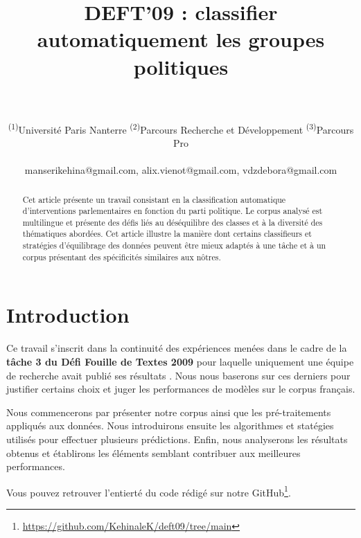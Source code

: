 \documentclass[11pt]{article}
\title{DEFT'09 : classifier automatiquement les groupes politiques}
\author{
  \text{MANSERI Kéhina\textsuperscript{(1)(2)}}
  \text{SIRVEN-VIENOT Alix\textsuperscript{(1)(2)}}
  \text{VAN-DEN-ZANDE Débora\textsuperscript{(1)(3)}}
\\
\\
  \textsuperscript{(1)}Université Paris Nanterre
  \textsuperscript{(2)}Parcours Recherche et Développement
  \textsuperscript{(3)}Parcours Pro
\\
\\
    \small {
    manserikehina@gmail.com, alix.vienot@gmail.com, vdzdebora@gmail.com
    }
\\
}
\begin{document}
\maketitle

\begin{abstract}

Cet article présente un travail consistant en la classification automatique d'interventions parlementaires en fonction du parti politique. Le corpus analysé est multilingue et présente des défis liés au déséquilibre des classes et à la diversité des thématiques abordées. Cet article illustre la manière dont certains classifieurs et stratégies d'équilibrage des données peuvent être mieux adaptés à une tâche et à un corpus présentant des spécificités similaires aux nôtres.


\end{abstract}

\section{Introduction}

Ce travail s'inscrit dans la continuité des expériences menées dans le cadre de la \textbf{tâche 3 du Défi Fouille de Textes 2009} pour laquelle uniquement une équipe de recherche avait publié ses résultats \cite{forest2009variation}. Nous nous baserons sur ces derniers pour justifier certains choix et juger les performances de modèles sur le corpus français.

Nous commencerons par présenter notre corpus ainsi que les pré-traitements appliqués aux données. Nous introduirons ensuite les algorithmes et statégies utilisés pour effectuer plusieurs prédictions. Enfin, nous analyserons les résultats obtenus et établirons les éléments semblant contribuer aux meilleures performances.

Vous pouvez retrouver l'entierté du code rédigé sur notre GitHub\footnote{\url{https://github.com/KehinaleK/deft09/tree/main}}.
\end{document}
